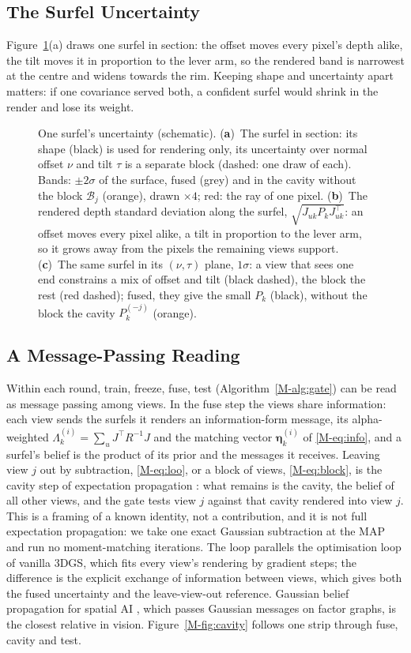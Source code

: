 \subsection{The Surfel Uncertainty}
Figure~\ref{fig:surfel}(a) draws one surfel in section: the offset moves every pixel's depth alike, the tilt moves it in proportion to the lever arm, so the rendered band is narrowest at the centre and widens towards the rim. Keeping shape and uncertainty apart matters: if one covariance served both, a confident surfel would shrink in the render and lose its weight.

\begin{figure}[!t]
\centering

\caption{One surfel's uncertainty (schematic). (\textbf{a})~The surfel in section: its shape (black) is
used for rendering only, its uncertainty over normal offset $\nu$ and tilt $\tau$ is a separate block
(dashed: one draw of each). Bands: $\pm2\sigma$ of the surface, fused (grey) and in the cavity without
the block $\mathcal{B}_j$ (orange), drawn $\times4$; red: the ray of one pixel. (\textbf{b})~The rendered
depth standard deviation along the surfel, $\sqrt{J_{uk}P_kJ_{uk}^{\top}}$: an offset moves every pixel
alike, a tilt in proportion to the lever arm, so it grows away from the pixels the remaining views
support. (\textbf{c})~The same surfel in its $(\nu,\tau)$ plane, $1\sigma$: a view that sees one end
constrains a mix of offset and tilt (black dashed), the block the rest (red dashed); fused, they give the
small $P_k$ (black), without the block the cavity $P_k^{(-j)}$ (orange).}
\label{fig:surfel}
\end{figure}

\subsection{A Message-Passing Reading}
Within each round, train, freeze, fuse, test (Algorithm~\ref{M-alg:gate}) can be read as message passing
among views. In the fuse step the views share information: each view sends the surfels it renders an information-form
message, its alpha-weighted $\Lambda_k^{(i)}=\sum_u J^{\top}R^{-1}J$ and the matching vector
$\boldsymbol\eta_k^{(i)}$ of \eqref{M-eq:info}, and a surfel's belief is the product of its prior and the
messages it receives. Leaving view $j$ out by subtraction, \eqref{M-eq:loo}, or a block of views,
\eqref{M-eq:block}, is the cavity step of
expectation propagation \cite{mp_minka_ep}: what remains is the cavity, the belief of all other views,
and the gate tests view $j$ against that cavity rendered into view $j$. This is a framing of a known
identity, not a contribution, and it is not full expectation propagation: we take one exact Gaussian
subtraction at the MAP and run no moment-matching iterations. The loop parallels the optimisation loop
of vanilla 3DGS, which fits every view's rendering by gradient steps; the difference is the explicit
exchange of information between views, which gives both the fused uncertainty and the leave-view-out
reference. Gaussian belief propagation for spatial AI \cite{mp_davison_gbp}, which passes Gaussian
messages on factor graphs, is the closest relative in vision. Figure~\ref{M-fig:cavity} follows one
strip through fuse, cavity and test.

